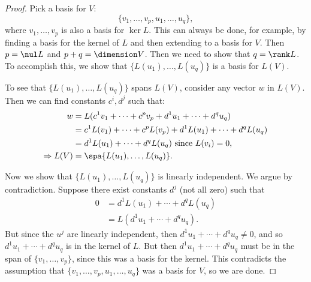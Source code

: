 \begin{proof}
Pick a basis for $V$:
\[
\{ v_1,\ldots,v_p,u_1,\ldots, u_q \},
\]
where $v_1,\ldots,v_p$ is also a basis for $\ker L$.  This can always be done, for example, by finding a basis for the kernel of $L$ and then extending to a basis for $V$.  Then $p=\nul L$ and $p+q=\dimension V$.  Then we need to show that $q=\rank L$.  To accomplish this, we show that 
$\{L(u_1),\ldots,L(u_q)\}$ is a basis for $L(V)$.

To see that $\{L(u_1),\ldots,L(u_q)\}$ spans $L(V)$, consider any vector $w$ in $L(V)$.  Then we can find constants $c^i, d^j$ such that:
\begin{align*}
w &= L(c^1v_1 + \cdots + c^pv_p+d^1u_1 + \cdots + d^qu_q)\\
  &= c^1L(v_1) + \cdots + c^pL(v_p)+d^1L(u_1)+\cdots+d^qL(u_q)\\
  &= d^1L(u_1)+\cdots+d^qL(u_q) \text{ since $L(v_i)=0$,}\\
\Rightarrow L(V) &= \spa \{L(u_1), \ldots, L(u_q)  \}.
\end{align*}

Now we show that $\{L(u_1),\ldots,L(u_q)\}$ is linearly independent.  We argue by contradiction. Suppose there exist constants $d^j$ (not all zero) such that
\begin{align*}
0 &= d^1L(u_1)+\cdots+d^qL(u_q)\\
  &= L(d^1u_1+\cdots+d^qu_q).
\end{align*}
But since the $u^j$ are linearly independent, then $d^1u_1+\cdots+d^qu_q\neq 0$, and so $d^1u_1+\cdots+d^qu_q$ is in the kernel of $L$.  But then $d^1u_1+\cdots+d^qu_q$ must be in the span of $\{v_1,\ldots, v_p\}$, since this was a basis for the kernel.  This contradicts the assumption that $\{ v_1,\ldots,v_p,u_1,\ldots, u_q \}$ was a basis for $V$, so we are done.
\end{proof}


